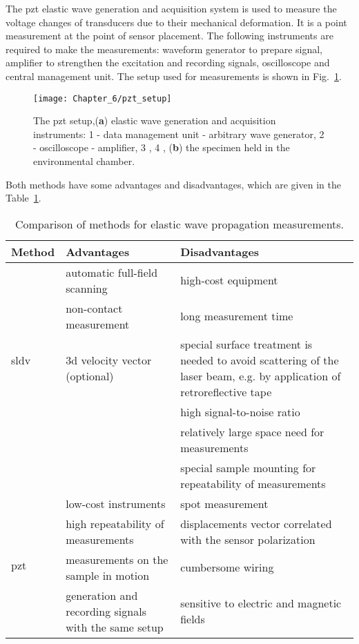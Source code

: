 The \ac{pzt} elastic wave generation and acquisition system is used to measure the voltage changes of transducers due to their mechanical deformation.
It is a point measurement at the point of sensor placement.
The following instruments are required to make the measurements: waveform generator to prepare signal, amplifier to strengthen the excitation and recording signals, oscilloscope and central management unit.
The setup used for measurements is shown in Fig.~\ref{fig:pzt_setup}.
\begin{figure}[t]
	\begin{center}
		\texttt{[image: Chapter\_6/pzt\_setup]}
	\end{center}
	\caption{The \acf{pzt} setup,(\textbf{a}) elastic wave generation and acquisition instruments:  1 - data management unit - arbitrary wave generator, 2 - oscilloscope - amplifier, 3 , 4 , (\textbf{b}) the specimen held in the environmental chamber.}
	\label{fig:pzt_setup}
\end{figure}

Both methods have some advantages and disadvantages, which are given in the Table~\ref{tab:method_comp}.
\begin{table}[H]
	\small
	\tabcolsep=0.25cm
	\caption{\label{tab:method_comp}Comparison of methods for elastic wave propagation measurements.}
	\begin{tabular}{p{}>{\raggedright}p{}>{\raggedright \arraybackslash}p{}}
		\toprule
		\textbf{Method} &\textbf{Advantages} & \textbf{Disadvantages}\\
		\midrule
		\multirow{5}{*}{\ac{sldv}}   & \tabitem automatic full-field scanning & \tabitem high-cost equipment\\ 
		& \tabitem non-contact measurement & \tabitem long measurement time\\
		& \tabitem \ac{3d} velocity vector (optional)& \tabitem special surface treatment is needed to avoid scattering of the laser beam, e.g. by application of retroreflective tape\\
		& & \tabitem high signal-to-noise ratio\\
		& & \tabitem relatively large space need for measurements \\
		& & \tabitem special sample mounting for repeatability of measurements\\
		\midrule
		\multirow{5}{*}{\ac{pzt}} & \tabitem low-cost instruments & \tabitem spot measurement\\
		& \tabitem high repeatability of measurements & \tabitem displacements vector correlated with the sensor polarization\\
		& \tabitem measurements on the sample in motion & \tabitem cumbersome wiring\\
		& \tabitem generation and recording signals with the same setup & \tabitem sensitive to electric and magnetic fields\\		
		\bottomrule
	\end{tabular}
\end{table}

